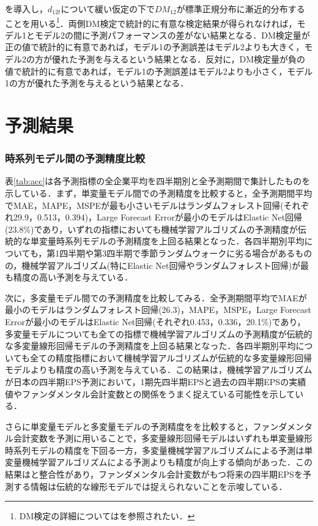 \documentclass[a4paper，11pt]{jsarticle}
\begin{document}
\noindent
を導入し，$d_{12t}$について緩い仮定の下で$DM_{12}$が標準正規分布に漸近的分布することを用いる\footnote{DM検定の詳細については\cite{diebold2002comparing}を参照されたい．}．両側DM検定で統計的に有意な検定結果が得られなければ，モデル1とモデル2の間に予測パフォーマンスの差がない結果となる．DM検定量が正の値で統計的に有意であれば，モデル1の予測誤差はモデル2よりも大きく，モデル2の方が優れた予測を与えるという結果となる．反対に，DM検定量が負の値で統計的に有意であれば，モデル1の予測誤差はモデル2よりも小さく，モデル1の方が優れた予測を与えるという結果となる．

\part{予測結果} \label{par:result}

\section{時系列モデル間の予測精度比較}

表\ref{tab:acc}は各予測指標の全企業平均を四半期別と全予測期間で集計したものを示している．まず，単変量モデル間での予測精度を比較すると，全予測期間平均でMAE，MAPE，MSPEが最も小さいモデルはランダムフォレスト回帰(それぞれ29.9，0.513，0.394)，Large Forecast Errorが最小のモデルはElastic Net回帰(23.8\%)であり，いずれの指標においても機械学習アルゴリズムの予測精度が伝統的な単変量時系列モデルの予測精度を上回る結果となった．各四半期別平均についても，第1四半期や第3四半期で季節ランダムウォークに劣る場合があるものの，機械学習アルゴリズム(特にElastic Net回帰やランダムフォレスト回帰)が最も精度の高い予測を与えている．

次に，多変量モデル間での予測精度を比較してみる．全予測期間平均でMAEが最小のモデルはランダムフォレスト回帰(26.3)，MAPE，MSPE，Large Forecast Errorが最小のモデルはElastic Net回帰(それぞれ0.453，0.336，20.1\%)であり，多変量モデルについても全ての指標で機械学習アルゴリズムの予測精度が伝統的な多変量線形回帰モデルの予測精度を上回る結果となった．各四半期別平均についても全ての精度指標において機械学習アルゴリズムが伝統的な多変量線形回帰モデルよりも精度の高い予測を与えている．この結果は，機械学習アルゴリズムが日本の四半期EPS予測において，1期先四半期EPSと過去の四半期EPSの実績値やファンダメンタル会計変数との関係をうまく捉えている可能性を示している．

さらに単変量モデルと多変量モデルの予測精度をを比較すると，ファンダメンタル会計変数を予測に用いることで，多変量線形回帰モデルはいずれも単変量線形時系列モデルの精度を下回る一方，多変量機械学習アルゴリズムによる予測は単変量機械学習アルゴリズムによる予測よりも精度が向上する傾向があった．この結果は\cite{zhang2004neural}と整合性があり，ファンダメンタル会計変数がもつ将来の四半期EPSを予測する情報は伝統的な線形モデルでは捉えられないことを示唆している．
\end{document}
